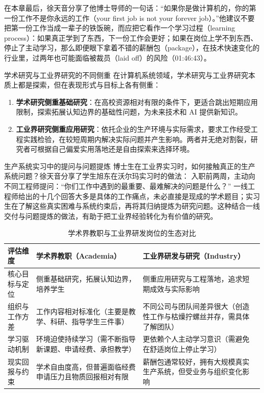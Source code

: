 \documentclass[UTF8,a4paper,11pt,fontset=fandol]{ctexart}
\begin{document}
在本章最后，徐天音分享了他博士导师的一句话：“如果你是做计算机的，你的第一份工作不是你永远的工作（your first job is not your forever job）。”他建议不要把第一份工作当成一辈子的铁饭碗，而应把它看作一个学习过程（learning process）：如果真正学到了东西，下一份工作会更好；如果在岗位上学不到东西、停止了主动学习，那么即便眼下拿着不错的薪酬包（package），在技术快速变化的行业里，过两年也可能面临被裁员（laid off）的风险（01:46:43）。

\begin{importantbox}{学术研究与工业界研究的不同侧重}
在计算机系统领域，学术研究与工业界研究本质上都是探索，但在表现形式与目标上各有侧重：
\begin{enumerate}
\item \textbf{学术研究侧重基础研究}：在高校资源相对有限的条件下，更适合跳出短期应用限制，探索拓展认知边界的基础性问题，为未来技术和 AI 提供新知识。
\item \textbf{工业界研究侧重应用研究}：依托企业的生产环境与实际需求，要求工作经受工程实践检验，在较短周期内解决实际问题并产生影响。两者并无绝对割裂，研究者可根据自己偏爱实用落地还是自由探索来选择环境。
\end{enumerate}
\end{importantbox}
\begin{knowledgebox}{生产系统实习中的提问与问题提炼}
博士生在工业界实习时，如何接触真正的生产系统问题？徐天音分享了学生旭东在沃尔玛实习时的做法：
入职前两周，主动向不同工程师提问：“你们工作中遇到的最重要、最难解决的问题是什么？”
一线工程师给出的十几个回答大多是具体的工作痛点，未必直接是现成的学术题目；实习生在了解这些真实困难与系统约束后，再将其归纳提炼为研究问题。这种结合一线交付与问题提炼的做法，有助于把工业界经验转化为有价值的研究。
\end{knowledgebox}
\begin{table}[H]\centering\small
\caption{学术界教职与工业界研发岗位的生态对比}
\begin{tabular}{>{\raggedright\arraybackslash}p{\dimexpr(\linewidth-6\tabcolsep)/3\relax}>{\raggedright\arraybackslash}p{\dimexpr(\linewidth-6\tabcolsep)/3\relax}>{\raggedright\arraybackslash}p{\dimexpr(\linewidth-6\tabcolsep)/3\relax}}
\toprule
评估维度 & 学术界教职（Academia） & 工业界研发与研究（Industry）\\\midrule
核心目标与定位 & 侧重基础研究，拓展认知边界，培养学生 & 侧重应用研究与工程落地，追求短期成效与实际影响\\[4pt]
组织与工作方差 & 工作内容相对标准化（主要是教学、科研、指导学生三件事） & 不同公司与团队间差异很大（创造性工作与枯燥拧螺丝并存，需具体了解团队）\\[4pt]
学习驱动机制 & 环境迫使持续学习（需不断指导新课题、申请经费、承担教学） & 更依赖个人主动学习意识（需避免在舒适岗位上停止学习）\\[4pt]
现实回报与约束 & 学术自由度高，但普遍面临经费申请压力且物质回报相对有限 & 薪酬包通常较好，拥有大规模真实生产系统，但受业务与组织变化影响\\[4pt]
\bottomrule\end{tabular}\end{table}
\end{document}
